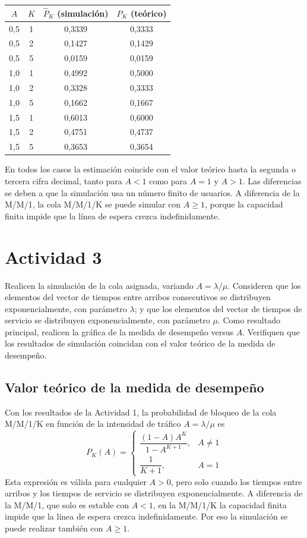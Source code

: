 \documentclass[12pt]{article}
\begin{document}
\begin{center}
\begin{tabular}{c c c c}
\hline
$A$ & $K$ & $\hat{P}_K$ (simulación) & $P_K$ (teórico) \\
\hline
0,5 & 1 & 0,3339 & 0,3333 \\
0,5 & 2 & 0,1427 & 0,1429 \\
0,5 & 5 & 0,0159 & 0,0159 \\
1,0 & 1 & 0,4992 & 0,5000 \\
1,0 & 2 & 0,3328 & 0,3333 \\
1,0 & 5 & 0,1662 & 0,1667 \\
1,5 & 1 & 0,6013 & 0,6000 \\
1,5 & 2 & 0,4751 & 0,4737 \\
1,5 & 5 & 0,3653 & 0,3654 \\
\hline
\end{tabular}
\end{center}

En todos los casos la estimación coincide con el valor teórico hasta la segunda o tercera cifra decimal, tanto para $A<1$ como para $A=1$ y $A>1$. Las diferencias se deben a que la simulación usa un número finito de usuarios. A diferencia de la M/M/1, la cola M/M/1/K se puede simular con $A\geq 1$, porque la capacidad finita impide que la línea de espera crezca indefinidamente.

\section{Actividad 3}

Realicen la simulación de la cola asignada, variando $A=\lambda/\mu$. Consideren que los elementos del vector de tiempos entre arribos consecutivos se distribuyen exponencialmente, con parámetro $\lambda$; y que los elementos del vector de tiempos de servicio se distribuyen exponencialmente, con parámetro $\mu$. Como resultado principal, realicen la gráfica de la medida de desempeño versus $A$. Verifiquen que los resultados de simulación coincidan con el valor teórico de la medida de desempeño.

\subsection{Valor teórico de la medida de desempeño}

Con los resultados de la Actividad 1, la probabilidad de bloqueo de la cola M/M/1/K en función de la intensidad de tráfico $A=\lambda/\mu$ es
\[
P_K(A)=
\begin{cases}
\dfrac{(1-A)A^{K}}{1-A^{K+1}}, & A\neq 1\\[3mm]
\dfrac{1}{K+1}, & A=1
\end{cases}
\]
Esta expresión es válida para cualquier $A>0$, pero solo cuando los tiempos entre arribos y los tiempos de servicio se distribuyen exponencialmente. A diferencia de la M/M/1, que solo es estable con $A<1$, en la M/M/1/K la capacidad finita impide que la línea de espera crezca indefinidamente. Por eso la simulación se puede realizar también con $A\geq 1$.
\end{document}
